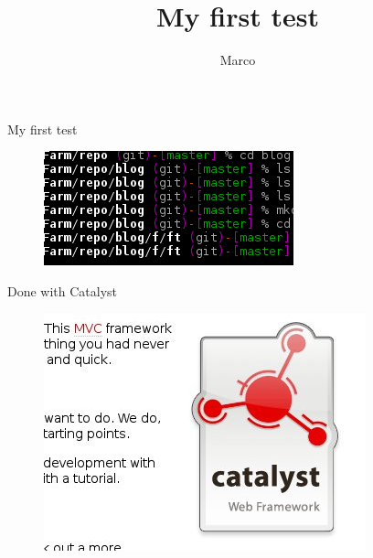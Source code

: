 \documentclass[DIV=9,fontsize=10pt,oneside,paper=a5]{scrartcl}
\title{My first test}
\date{}
\author{Marco}
\begin{document}
\maketitle




My first test


\begin{figure}[htp!]
\centering
\includegraphics[width=\textwidth]{testimage.png}
\end{figure}


Done with Catalyst


\begin{figure}[htp!]
\centering
\includegraphics[width=\textwidth]{cata.jpg}
\end{figure}



\cleardoublepage

\thispagestyle{empty}
\strut
\vfill

\begin{center}





\end{center}
\end{document}
